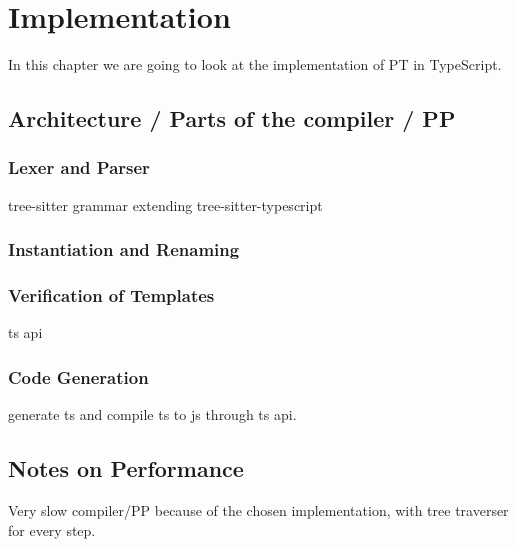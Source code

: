 
\chapter{Implementation}\label{ch:implementation}

In this chapter we are going to look at the implementation of PT in TypeScript.

\section{Architecture / Parts of the compiler / PP}\label{sec:architecture}



\subsection{Lexer and Parser}\label{subsec:lexer-and-parser}

tree-sitter grammar extending tree-sitter-typescript

\subsection{Instantiation and Renaming}\label{subsec:instantiation-and-renaming}


\subsection{Verification of Templates}\label{subsec:verification-of-templates}

ts api

\subsection{Code Generation}\label{subsec:code-generation}

generate ts and compile ts to js through ts api.

\section{Notes on Performance}\label{sec:notes-on-performance}

Very slow compiler/PP because of the chosen implementation, with tree traverser for every step.


